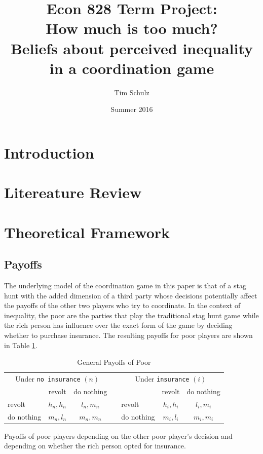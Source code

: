 \documentclass[12pt]{article}
\title{Econ 828 Term Project:\\ How much is too much?\\
		Beliefs about perceived inequality in a coordination game}
\author{Tim Schulz}
\date{Summer 2016}
\begin{document}
	\maketitle
	\doublespacing
	\section{Introduction}
	\section{Litereature Review}
	\section{Theoretical Framework}
	\subsection{Payoffs}
	The underlying model of the coordination game in this paper is that of a 
	stag hunt with the added dimension of a third party whose decisions 
	potentially affect the payoffs of the other two players who try to 
	coordinate. In the context of inequality, the poor are the parties that 
	play the traditional stag hunt game while the rich person has influence 
	over the exact form of the game by deciding whether to purchase insurance. 
	The resulting payoffs for poor players are shown in Table \ref{gpayoff}.
	
	\begin{table}[!htbp]
		\caption{General Payoffs of Poor}
		\label{gpayoff}
		\begin{center}
		\begin{tabular}{|l|c|c|c|l|c|c|}
			\multicolumn{3}{c}{Under \texttt{no insurance} $(n)$} &
			\multicolumn{1}{c}{} &
			\multicolumn{3}{c}{Under \texttt{insurance} $(i)$}\\
			\cline{1-3}\cline{5-7}
			& revolt & do nothing & & & revolt & do nothing\\
			\cline{1-3}\cline{5-7}
			revolt & $h_n, h_n$ & $l_n, m_n$ && revolt & $h_i, h_i$ & $l_i, 
			m_i$\\
			\cline{1-3}\cline{5-7}
			do nothing & $m_n, l_n$ & $m_n, m_n$ && do nothing & $m_i, l_i$ & 
			$m_i, m_i$\\
			\cline{1-3}\cline{5-7}
		\end{tabular}
		\end{center}
		\footnotesize
		Payoffs of poor players depending on the other poor player's decision 
		and depending on whether the rich person opted for insurance. 
	\end{table}
	
\end{document}
